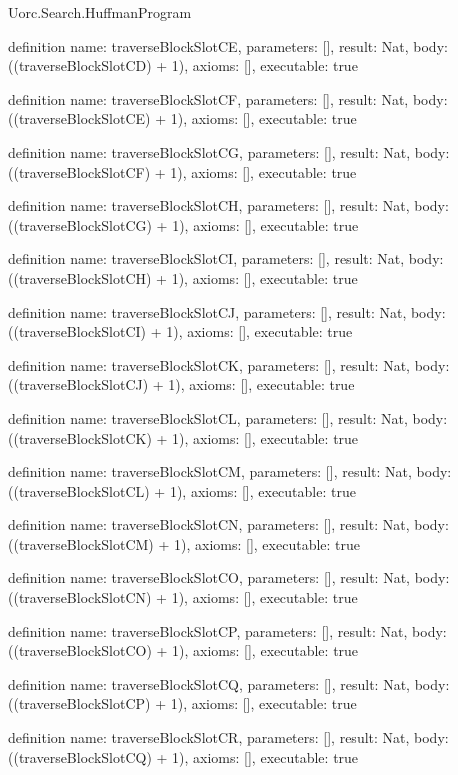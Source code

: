 \begin{lexlean}{Uorc.Search.HuffmanProgram}
\begin{semanticmodule}
definition{
  name: traverseBlockSlotCE,
  parameters: [],
  result: Nat,
  body: ((traverseBlockSlotCD) + 1),
  axioms: [],
  executable: true
}

definition{
  name: traverseBlockSlotCF,
  parameters: [],
  result: Nat,
  body: ((traverseBlockSlotCE) + 1),
  axioms: [],
  executable: true
}

definition{
  name: traverseBlockSlotCG,
  parameters: [],
  result: Nat,
  body: ((traverseBlockSlotCF) + 1),
  axioms: [],
  executable: true
}

definition{
  name: traverseBlockSlotCH,
  parameters: [],
  result: Nat,
  body: ((traverseBlockSlotCG) + 1),
  axioms: [],
  executable: true
}

definition{
  name: traverseBlockSlotCI,
  parameters: [],
  result: Nat,
  body: ((traverseBlockSlotCH) + 1),
  axioms: [],
  executable: true
}

definition{
  name: traverseBlockSlotCJ,
  parameters: [],
  result: Nat,
  body: ((traverseBlockSlotCI) + 1),
  axioms: [],
  executable: true
}

definition{
  name: traverseBlockSlotCK,
  parameters: [],
  result: Nat,
  body: ((traverseBlockSlotCJ) + 1),
  axioms: [],
  executable: true
}

definition{
  name: traverseBlockSlotCL,
  parameters: [],
  result: Nat,
  body: ((traverseBlockSlotCK) + 1),
  axioms: [],
  executable: true
}

definition{
  name: traverseBlockSlotCM,
  parameters: [],
  result: Nat,
  body: ((traverseBlockSlotCL) + 1),
  axioms: [],
  executable: true
}

definition{
  name: traverseBlockSlotCN,
  parameters: [],
  result: Nat,
  body: ((traverseBlockSlotCM) + 1),
  axioms: [],
  executable: true
}

definition{
  name: traverseBlockSlotCO,
  parameters: [],
  result: Nat,
  body: ((traverseBlockSlotCN) + 1),
  axioms: [],
  executable: true
}

definition{
  name: traverseBlockSlotCP,
  parameters: [],
  result: Nat,
  body: ((traverseBlockSlotCO) + 1),
  axioms: [],
  executable: true
}

definition{
  name: traverseBlockSlotCQ,
  parameters: [],
  result: Nat,
  body: ((traverseBlockSlotCP) + 1),
  axioms: [],
  executable: true
}

definition{
  name: traverseBlockSlotCR,
  parameters: [],
  result: Nat,
  body: ((traverseBlockSlotCQ) + 1),
  axioms: [],
  executable: true
}


\end{semanticmodule}
\end{lexlean}
